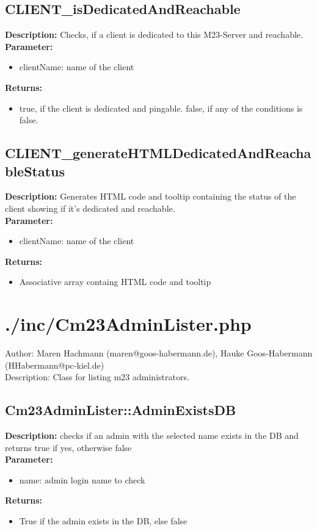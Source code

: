 \subsection{CLIENT\_isDedicatedAndReachable}
\textbf{Description:} Checks, if a client is dedicated to this M23-Server and reachable.\\
\textbf{Parameter:}
\begin{itemize}
\item clientName: name of the client
\end{itemize}
\textbf{Returns:}
\begin{itemize}
\item true, if the client is dedicated and pingable. false, if any of the conditions is false.
\end{itemize}

\subsection{CLIENT\_generateHTMLDedicatedAndReachableStatus}
\textbf{Description:} Generates HTML code and tooltip containing the status of the client showing if it's dedicated and reachable.\\
\textbf{Parameter:}
\begin{itemize}
\item clientName: name of the client
\end{itemize}
\textbf{Returns:}
\begin{itemize}
\item Associative array containg HTML code and tooltip 
\end{itemize}

\newpage\section{./inc/Cm23AdminLister.php}
 Author: Maren Hachmann (maren@goos-habermann.de), Hauke Goos-Habermann (HHabermann@pc-kiel.de)\\
 Description: Class for listing m23 administrators.\\

\subsection{Cm23AdminLister::AdminExistsDB}
\textbf{Description:} checks if an admin with the selected name exists in the DB and returns true if yes, otherwise false\\
\textbf{Parameter:}
\begin{itemize}
\item name: admin login name to check
\end{itemize}
\textbf{Returns:}
\begin{itemize}
\item True if the admin exists in the DB, else false
\end{itemize}

